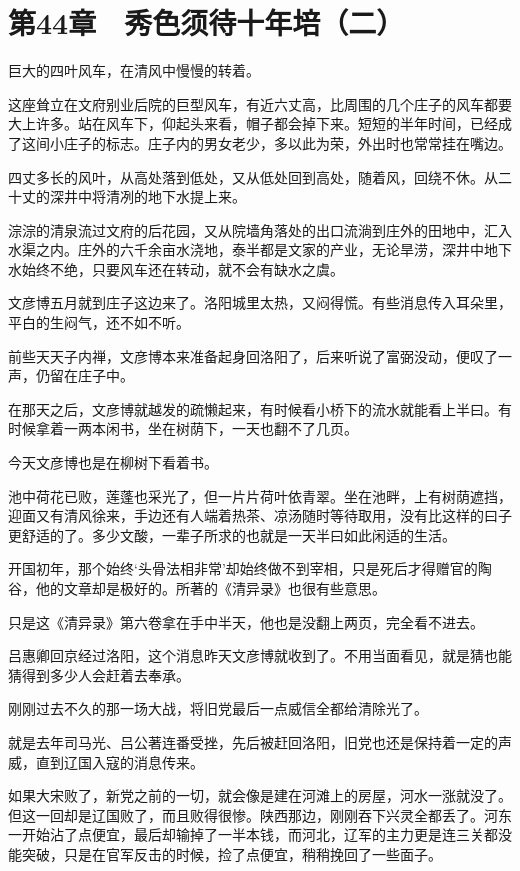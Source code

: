 \section{第44章　秀色须待十年培（二）}

巨大的四叶风车，在清风中慢慢的转着。

这座耸立在文府别业后院的巨型风车，有近六丈高，比周围的几个庄子的风车都要大上许多。站在风车下，仰起头来看，帽子都会掉下来。短短的半年时间，已经成了这间小庄子的标志。庄子内的男女老少，多以此为荣，外出时也常常挂在嘴边。

四丈多长的风叶，从高处落到低处，又从低处回到高处，随着风，回绕不休。从二十丈的深井中将清冽的地下水提上来。

淙淙的清泉流过文府的后花园，又从院墙角落处的出口流淌到庄外的田地中，汇入水渠之内。庄外的六千余亩水浇地，泰半都是文家的产业，无论旱涝，深井中地下水始终不绝，只要风车还在转动，就不会有缺水之虞。

文彦博五月就到庄子这边来了。洛阳城里太热，又闷得慌。有些消息传入耳朵里，平白的生闷气，还不如不听。

前些天天子内禅，文彦博本来准备起身回洛阳了，后来听说了富弼没动，便叹了一声，仍留在庄子中。

在那天之后，文彦博就越发的疏懒起来，有时候看小桥下的流水就能看上半曰。有时候拿着一两本闲书，坐在树荫下，一天也翻不了几页。

今天文彦博也是在柳树下看着书。

池中荷花已败，莲蓬也采光了，但一片片荷叶依青翠。坐在池畔，上有树荫遮挡，迎面又有清风徐来，手边还有人端着热茶、凉汤随时等待取用，没有比这样的曰子更舒适的了。多少文酸，一辈子所求的也就是一天半曰如此闲适的生活。

开国初年，那个始终‘头骨法相非常’却始终做不到宰相，只是死后才得赠官的陶谷，他的文章却是极好的。所著的《清异录》也很有些意思。

只是这《清异录》第六卷拿在手中半天，他也是没翻上两页，完全看不进去。

吕惠卿回京经过洛阳，这个消息昨天文彦博就收到了。不用当面看见，就是猜也能猜得到多少人会赶着去奉承。

刚刚过去不久的那一场大战，将旧党最后一点威信全都给清除光了。

就是去年司马光、吕公著连番受挫，先后被赶回洛阳，旧党也还是保持着一定的声威，直到辽国入寇的消息传来。

如果大宋败了，新党之前的一切，就会像是建在河滩上的房屋，河水一涨就没了。但这一回却是辽国败了，而且败得很惨。陕西那边，刚刚吞下兴灵全都丢了。河东一开始沾了点便宜，最后却输掉了一半本钱，而河北，辽军的主力更是连三关都没能突破，只是在官军反击的时候，捡了点便宜，稍稍挽回了一些面子。

